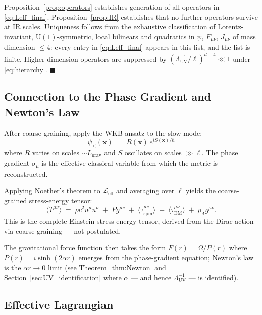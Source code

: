 \documentclass[11pt,a4paper]{article}
\theoremstyle{definition}
\theoremstyle{remark}
\begin{document}
		Proposition~\ref{prop:operators} establishes generation of all operators in
		\eqref{eq:Leff_final}.  Proposition~\ref{prop:IR} establishes that no further
		operators survive at IR scales.  Uniqueness follows from the exhaustive
		classification of Lorentz-invariant, $\mathrm{U}(1)$-symmetric, local
		bilinears and quadratics in $\psi$, $F_{\mu\nu}$, $J_{\mu\nu}$ of mass
		dimension $\leq 4$: every entry in \eqref{eq:Leff_final} appears in this
		list, and the list is finite. Higher-dimension operators are suppressed by
		$(\Lambda_{\mathrm{UV}}^{-1}/\ell)^{d-4} \ll 1$ under \eqref{eq:hierarchy}.
		\hfill$\blacksquare$
	
	\subsection{Connection to the Phase Gradient and Newton's Law}
	\label{sec:coarse:F}
	
	After coarse-graining, apply the WKB ansatz to the slow mode:
	\begin{equation}
		\psi_{<}(\mathbf{x})
		\;=\; R(\mathbf{x})\,e^{iS(\mathbf{x})/\hbar}
	\end{equation}
	where $R$ varies on scales $\sim L_{\mathrm{grav}}$ and $S$ oscillates on
	scales $\gg \ell$.  The phase gradient $\sigma_\mu$ is the effective classical
	variable from which the metric is reconstructed.
	
	Applying Noether's theorem to $\mathcal{L}_{\mathrm{eff}}$ and averaging over
	$\ell$ yields the coarse-grained stress-energy tensor:
	\begin{equation}
		\boxed{
			\langle T^{\mu\nu}\rangle
			\;=\; \rho c^2 u^\mu u^\nu
			\;+\; Pg^{\mu\nu}
			\;+\; \langle\tau^{\mu\nu}_{\mathrm{spin}}\rangle
			\;+\; \langle\tau^{\mu\nu}_{\mathrm{EM}}\rangle
			\;+\; \rho_\Lambda g^{\mu\nu}.
		}
		\label{eq:Tmunu_full}
	\end{equation}
	This is the complete Einstein stress-energy tensor, derived from the Dirac
	action via coarse-graining --- not postulated.
	
	The gravitational force function then takes the form $F(r) = \Omega/P(r)$
	where $P(r) = i\sinh(2\alpha r)$ emerges from the phase-gradient equation;
	Newton's law is the $\alpha r \to 0$ limit (see Theorem~\ref{thm:Newton} and
	Section~\ref{sec:UV_identification} where $\alpha$ --- and hence
	$\Lambda_{\mathrm{UV}}^{-1}$ --- is identified).
	
	\subsection{Effective Lagrangian}
	
\end{document}
